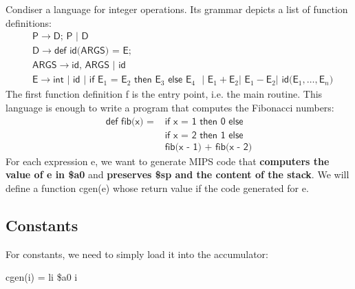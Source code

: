 Condiser a language for integer operations. Its grammar depicts a list of function definitions:
\begin{equation*}\begin{split}
&\textsf{P}\rightarrow\textsf{D; P } | \textsf{ D}\\
&\textsf{D}\rightarrow\textsf{def id(ARGS) = E};\\
&\textsf{ARGS}\rightarrow\textsf{id, ARGS }|\textsf{ id}\\
&\textsf{E}\rightarrow\textsf{int }|\textsf{ id }|\textsf{ if E$_1$ = E$_2$ then E$_3$ else E$_4$ } | \textsf{ E}_1+\textsf{E}_2 | \textsf{ E}_1 - \textsf{E}_2 | \textsf{ id(E$_1,\dots,$E$_n$)}
\end{split}\end{equation*}
The first function definition \textsf{f} is the entry point, i.e. the \textsf{main} routine. This language is enough to write a program that computes the Fibonacci numbers:
\begin{equation}\label{fibonacci}\begin{split}
\textsf{def fib(x) = }&\textsf{if x = 1 then 0 else}\\
&\textsf{if x = 2 then 1 else}\\
&\textsf{fib(x - 1) + fib(x - 2)}
\end{split}\end{equation}
For each expression \textsf{e}, we want to generate MIPS code that \textbf{computers the value of \textsf{e} in \$a0} and \textbf{preserves \$sp and the content of the stack}. We will define a function \textsf{cgen(e)} whose return value if the code generated for \textsf{e}.

\subsection{Constants}
For constants, we need to simply load it into the accumulator:
\begin{center}
\textsf{\color{red}cgen(i)}\textsf{ = li \$a0 i}
\end{center}

